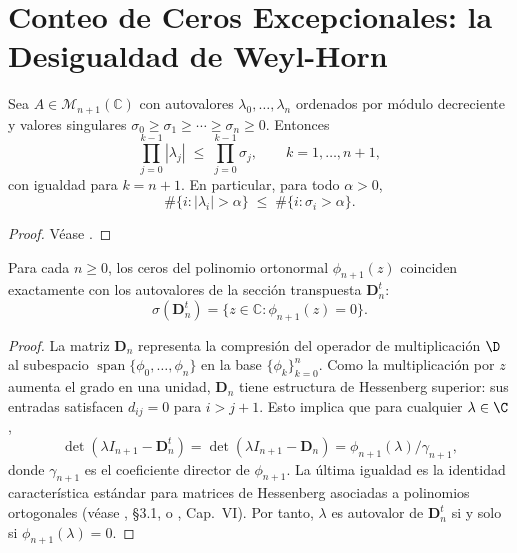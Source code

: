 \section{Conteo de Ceros Excepcionales: la Desigualdad de Weyl-Horn}

\begin{lem}\label{lem:weyl_horn}
	Sea $A\in\mathcal{M}_{n+1}(\mathbb{C})$ con autovalores $\lambda_0,\dots,\lambda_n$
	ordenados por módulo decreciente y valores singulares
	$\sigma_0\ge\sigma_1\ge\cdots\ge\sigma_n\ge 0$. Entonces
	\[
		\prod_{j=0}^{k-1}|\lambda_j|\;\le\;\prod_{j=0}^{k-1}\sigma_j,
		\qquad k=1,\dots,n+1,
	\]
	con igualdad para $k=n+1$. En particular, para todo $\alpha>0$,
	\[
		\#\{i:|\lambda_i|>\alpha\}\;\le\;\#\{i:\sigma_i>\alpha\}.
	\]
\end{lem}

\begin{proof}
	Véase \cite[Thm.~3.3.2]{horn2012matrix}.
\end{proof}

\begin{prop}\label{prop:autovalores_ceros}
	Para cada $n \ge 0$, los ceros del polinomio ortonormal $\phi_{n+1}(z)$ coinciden exactamente con los autovalores de la sección transpuesta $\mathbf{D}_n^t$:
	\[
		\sigma(\mathbf{D}_n^t) = \{z \in \mathbb{C} : \phi_{n+1}(z) = 0\}.
	\]
\end{prop}

\begin{proof}
	La matriz $\mathbf{D}_n$ representa la compresión del operador de multiplicación $\D$ al subespacio $\operatorname{span}\{\phi_0,\dots,\phi_n\}$ en la base $\{\phi_k\}_{k=0}^n$. Como la multiplicación por $z$ aumenta el grado en una unidad, $\mathbf{D}_n$ tiene estructura de Hessenberg superior: sus entradas satisfacen $d_{ij}=0$ para $i>j+1$. Esto implica que para cualquier $\lambda\in\C$,
	\[
		\det(\lambda I_{n+1}-\mathbf{D}_n^t)=\det(\lambda I_{n+1}-\mathbf{D}_n)
		=\phi_{n+1}(\lambda)/\gamma_{n+1},
	\]
	donde $\gamma_{n+1}$ es el coeficiente director de $\phi_{n+1}$. La última igualdad es la identidad característica estándar para matrices de Hessenberg asociadas a polinomios ortogonales (véase \cite{szego1975orthogonal}, §3.1, o \cite{gohberg1969introduction}, Cap.~VI). Por tanto, $\lambda$ es autovalor de $\mathbf{D}_n^t$ si y solo si $\phi_{n+1}(\lambda)=0$.
\end{proof}

